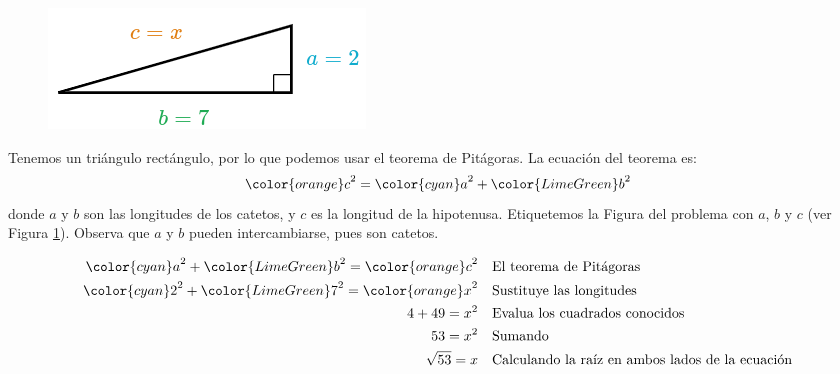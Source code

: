 \begin{minipage}[t][][t]{0.6\textwidth}
    \begin{solutionbox}{9cm}
        \begin{minipage}{0.4\textwidth}
            \begin{figure}[H]
                \centering
                \includegraphics[width=0.9\linewidth]{../images/lados_pitagoras_18a.png}
                \caption{}
                \label{fig:lados_pitagoras_18a}
            \end{figure}
        \end{minipage}\hfill
        \begin{minipage}{0.55\textwidth}
            Tenemos un triángulo rectángulo, por lo que podemos usar el teorema de Pitágoras.
            La ecuación del teorema es:
            \[{\color{orange}c}^2={\color{cyan}a}^2+{\color{LimeGreen}b}^2\]
            donde $a$ y $b$ son las longitudes de los catetos, y $c$ es la longitud de la hipotenusa.
            Etiquetemos la Figura del problema con $a$, $b$ y $c$ (ver Figura \ref{fig:lados_pitagoras_18a}).
            Observa que $a$ y $b$ pueden intercambiarse, pues son catetos.
        \end{minipage}
        \begin{align*}
            {\color{cyan}a}^2+{\color{LimeGreen}b}^2  ={\color{orange}c}^2 & \text{\quad El teorema de Pitágoras}                          \\
            {\color{cyan}2}^2+{\color{LimeGreen}7}^2  ={\color{orange}x}^2 & \text{\quad Sustituye las longitudes}                         \\
            4+49   =x^2                                                    & \text{\quad Evalua los cuadrados conocidos}                   \\
            53=x^2                                                         & \text{\quad Sumando }                                         \\
            \sqrt{53}=x                                                    & \text{\quad Calculando la raíz en ambos lados de la ecuación} \\
        \end{align*}
    \end{solutionbox}
\end{minipage}

